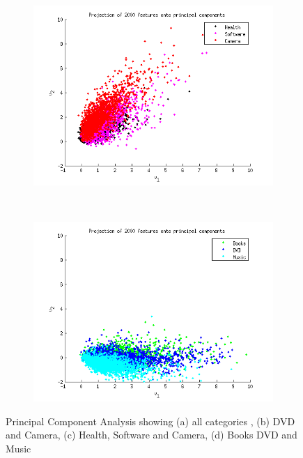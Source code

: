 \begin{figure}[h!btcp]
	    \begin{subfigure}[b]{0.5\textwidth}
	            \centering
	            \includegraphics[width=\linewidth]{../Plottar/pca_largecorr.png}
	                           \caption{}
	    \end{subfigure}%
	    ~ %
	    \begin{subfigure}[b]{0.5\textwidth}
	            \centering
	            \includegraphics[width=\textwidth]{../Plottar/pca_somecorr.png} 
              \caption{}
	    \end{subfigure}
	    \caption{Principal Component Analysis showing (a) all categories , (b) DVD and Camera, (c) Health, Software and Camera, (d) Books DVD and Music}
	    \label{fig:pca_results}
\end{figure}

